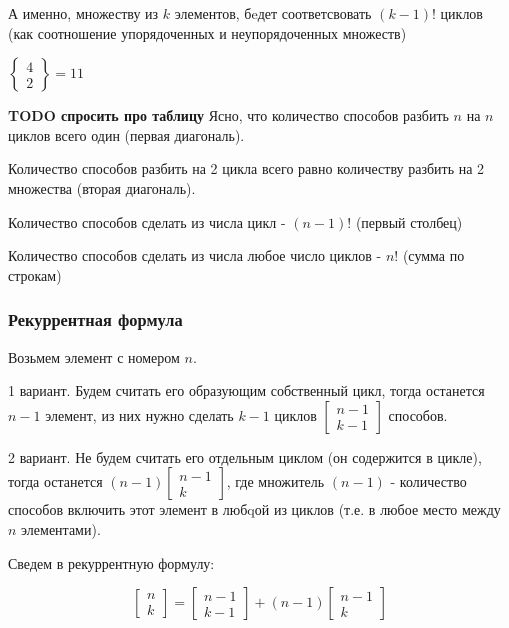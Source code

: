 А именно, множеству из $ k $ элементов, бeдет соответсвовать $ (k-1)! $ циклов 
(как соотношение упорядоченных и неупорядоченных множеств)

$\begin{Bmatrix}
4 \\
2
\end{Bmatrix} = 11$


\textbf{TODO спросить про таблицу}
Ясно, что количество способов разбить $ n $ на $ n $ циклов всего один (первая диагональ).

Количество способов разбить на 2 цикла всего равно количеству 
разбить на 2 множества (вторая диагональ).

Количество способов сделать из числа цикл - $ (n-1)! $ (первый столбец)

Количество способов сделать из числа любое число циклов - $ n!$ (сумма по строкам)

\subsubsection{Рекуррентная формула}

Возьмем элемент с номером $ n $.

1 вариант. Будем считать его образующим собственный цикл, 
тогда останется $ n-1 $ элемент, из них нужно сделать $ k-1 $ циклов
$\begin{bmatrix}
n-1 \\
k-1
\end{bmatrix}$ способов.

2 вариант. Не будем считать его отдельным циклом
(он содержится в цикле), тогда останется
$ (n-1) \begin{bmatrix}
n-1 \\
k
\end{bmatrix}$, где множитель $ (n-1) $ - количество способов включить 
этот элемент в любqой из циклов (т.е. в любое место между $ n $ элементами).

Сведем в рекуррентную формулу:

$$
\begin{bmatrix}
n \\
k
\end{bmatrix} = 
\begin{bmatrix}
n-1 \\
k-1
\end{bmatrix} +
(n-1) \begin{bmatrix}
n-1 \\
k
\end{bmatrix}
$$

